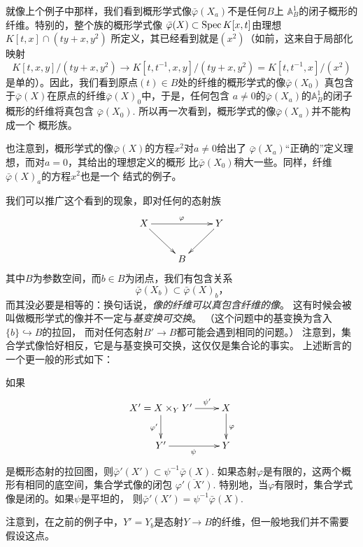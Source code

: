 就像上个例子中那样，我们看到概形学式像$\bar\varphi(X_a)$不是任何$B$上
$\mathbb A_B^1$的闭子概形的纤维。特别的，整个族的概形学式像
$\bar{\varphi}(X) \subset \operatorname{Spec} K[x, t]$由理想$K[t, x] \cap(t y+x, y^2)$
所定义，其已经看到就是$(x^2)$（如前，这来自于局部化映射
\[
    K[t, x, y] /(t y+x, y^2) \to K[t, t^{-1}, x, y] /
    (t y+x, y^2)=K[t, t^{-1}, x] /(x^2)
\]
是单的）。因此，我们看到原点$(t)\in B$处的纤维的概形学式的像$\bar\varphi(X_0)$
真包含于$\bar\varphi(X)$在原点的纤维$\bar\varphi(X)_0$中，于是，任何包含
$a\neq 0$的$\bar\varphi(X_a)$的$\mathbb A_B^1$的闭子概形的纤维将真包含
$\bar\varphi(X_0)$. 所以再一次看到，概形学式的像$\bar\varphi(X_a)$并不能构成一个
概形族。

也注意到，概形学式的像$\bar\varphi(X)$的方程$x^2$对$a\neq 0$给出了
$\bar\varphi(X_a)$“正确的”定义理想，而对$a=0$，其给出的理想定义的概形
比$\bar\varphi(X_0)$稍大一些。同样，纤维$\bar\varphi(X)_a$的方程$x^2$也是一个
结式的例子。

我们可以推广这个看到的现象，即对任何的态射族
\[
    \xymatrix{
        X\ar[rr]^\varphi\ar[rd]&&Y\ar[ld]\\
        &B&
    }
\]
其中$B$为参数空间，而$b\in B$为闭点，我们有包含关系
\[
    \bar{\varphi}(X_b) \subset \bar{\varphi}(X)_b，
\]
而其没必要是相等的：换句话说，\textit{像的纤维可以真包含纤维的像}。
这有时候会被叫做概形学式的像并不一定与\textit{基变换可交换}。
（这个问题中的基变换为含入$\{b\}\hookrightarrow B$的拉回，
而对任何态射$B'\to B$都可能会遇到相同的问题。）
注意到，集合学式像恰好相反，它是与基变换可交换，这仅仅是集合论的事实。
上述断言的一个更一般的形式如下：


\begin{pro}\label{pro:5.8}
    如果
    \[
    \xymatrix{
        X'=X\times_Y Y'\ar[r]^-{\psi'}\ar[d]_{\varphi'}&X\ar[d]^\varphi\\
        Y'\ar[r]_{\psi}&Y
    }
    \]
    是概形态射的拉回图，则$\bar\varphi'(X')\subset \psi^{-1}\bar\varphi(X)$.
    如果态射$\varphi$是有限的，这两个概形有相同的底空间，集合学式像的闭包
    $\overline{\varphi'(X')}$. 
    特别地，当$\varphi$有限时，集合学式像是闭的。如果$\psi$是平坦的，
    则$\bar\varphi'(X')=\psi^{-1}\bar\varphi(X)$.
\end{pro}

注意到，在之前的例子中，$Y'=Y_b$是态射$Y\to B$的纤维，但一般地我们并不需要假设这点。

